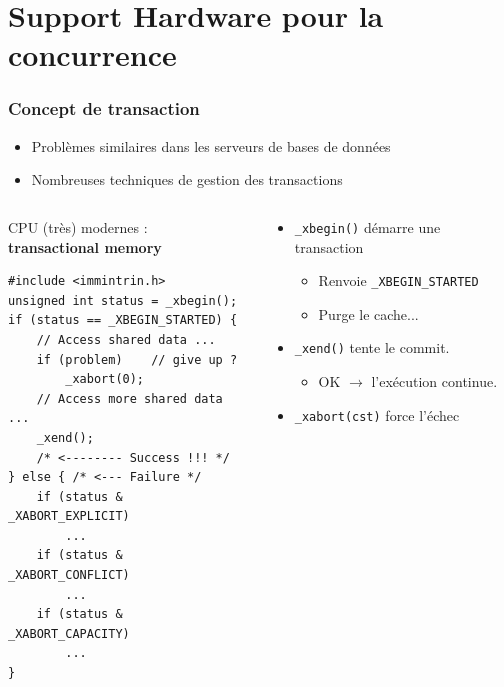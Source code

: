 \documentclass[xcolor={x11names,svgnames},x11names,svgnames]{beamer}
\begin{document}

\section{Support Hardware pour la concurrence}

\begin{frame}[fragile, label=rtm]
  \frametitle{Concept de \og transaction \fg{}}

  \begin{itemize}
  \item Problèmes similaires dans les serveurs de bases de données
  \item Nombreuses techniques de gestion des transactions
  \end{itemize}

  \begin{columns}
    \begin{column}{0.47\textwidth}
  \begin{alertblock}{CPU (très) modernes :\\ \textbf{transactional memory}}
\begin{verbatim}
#include <immintrin.h>
unsigned int status = _xbegin();
if (status == _XBEGIN_STARTED) {
    // Access shared data ...
    if (problem)    // give up ?
        _xabort(0); 
    // Access more shared data ...
    _xend();
    /* <-------- Success !!! */
} else { /* <--- Failure */
    if (status & _XABORT_EXPLICIT)
        ...
    if (status & _XABORT_CONFLICT)
        ...    
    if (status & _XABORT_CAPACITY)
        ...
}
\end{verbatim}
  \end{alertblock}
\end{column}
\begin{column}{0.63\textwidth}
  \begin{itemize}
  \item \verb|_xbegin()| démarre une transaction
    \begin{itemize}
    \item Renvoie \verb|_XBEGIN_STARTED|
    \item Purge le cache...
    \end{itemize}
  \item \verb|_xend()| tente le \og commit\fg{}.
    \begin{itemize}
    \item OK $\rightarrow$ l'exécution continue.
    \end{itemize}
  \item \verb|_xabort(cst)| force l'échec


\end{itemize}
\end{column}
\end{columns}
\end{frame}
\end{document}
